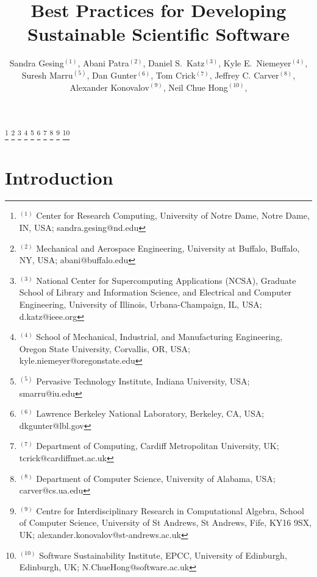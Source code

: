 \documentclass[11pt, oneside]{amsart}
\begin{document}
\title[]{Best Practices for Developing Sustainable Scientific Software}

\author{Sandra Gesing$^{(1)}$,
Abani Patra$^{(2)}$,
Daniel S.\ Katz$^{(3)}$,
Kyle E.\ Niemeyer$^{(4)}$,
Suresh Marru$^{(5)}$,
Dan Gunter$^{(6)}$,
Tom Crick$^{(7)}$,
Jeffrey C. Carver$^{(8)}$,
Alexander Konovalov$^{(9)}$,
Neil Chue Hong$^{(10)}$,
}

%
\thanks{{}$^{(1)}$ Center for Research Computing, University of Notre Dame, Notre Dame, IN, USA; sandra.gesing@nd.edu}
%
\thanks{{}$^{(2)}$ Mechanical and Aerospace Engineering, University at Buffalo, Buffalo, NY, USA; abani@buffalo.edu}
%
\thanks{{}$^{(3)}$ National Center for Supercomputing Applications (NCSA), Graduate School of Library and Information Science, and Electrical and Computer Engineering, University of Illinois, Urbana-Champaign, IL, USA; d.katz@ieee.org}
%
\thanks{{}$^{(4)}$ School of Mechanical, Industrial, and Manufacturing Engineering, Oregon State University, Corvallis, OR, USA; kyle.niemeyer@oregonstate.edu}
%
\thanks{{}$^{(5)}$ Pervasive Technology Institute, Indiana University, USA; smarru@iu.edu}
%
\thanks{{}$^{(6)}$ Lawrence Berkeley National Laboratory, Berkeley, CA, USA; dkgunter@lbl.gov}
%
\thanks{{}$^{(7)}$ Department of Computing, Cardiff Metropolitan University, UK; tcrick@cardiffmet.ac.uk}
%
\thanks{{}$^{(8)}$ Department of Computer Science, University of Alabama, USA; carver@cs.ua.edu}
%
\thanks{{}$^{(9)}$  Centre for Interdisciplinary Research in Computational Algebra, School of Computer Science,
University of St Andrews, St Andrews, Fife, KY16 9SX, UK; alexander.konovalov@st-andrews.ac.uk}
%
\thanks{{}$^{(10)}$  Software Sustainability Institute, EPCC, University of Edinburgh, Edinburgh, UK; N.ChueHong@software.ac.uk}
% 
\begin{abstract}


\end{abstract}

\maketitle
\newpage

\section{Introduction} \label{sec:intro}
\end{document}
